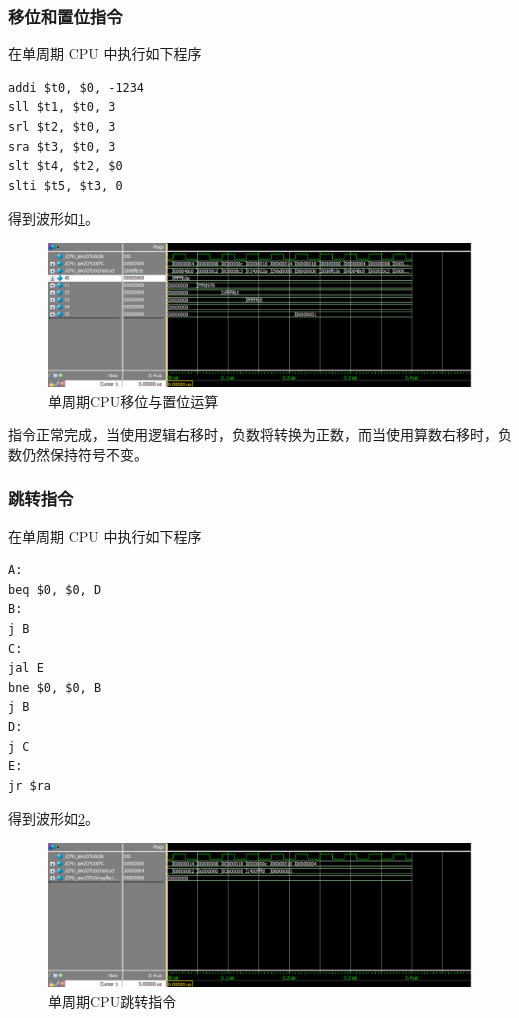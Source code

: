\documentclass{ctexart}
\begin{document}
	\subsubsection{移位和置位指令}

	在单周期 CPU 中执行如下程序

\begin{lstlisting}
addi $t0, $0, -1234
sll $t1, $t0, 3
srl $t2, $t0, 3
sra $t3, $t0, 3
slt $t4, $t2, $0
slti $t5, $t3, 0
\end{lstlisting}

	得到波形如\ref{simpicture4}。

	\begin{figure}[ht]
		\centering
		\includegraphics[width = \textwidth]{OneCycleTestWave3.eps}
		\caption{单周期CPU移位与置位运算}
		\label{simpicture4}
	\end{figure}	

	指令正常完成，当使用逻辑右移时，负数将转换为正数，而当使用算数右移时，负数仍然保持符号不变。	

	\subsubsection{跳转指令}

	在单周期 CPU 中执行如下程序

\begin{lstlisting}
A:
beq $0, $0, D
B:
j B
C:
jal E
bne $0, $0, B
j B
D:
j C
E:
jr $ra
\end{lstlisting}	

	得到波形如\ref{simpicture5}。

	\begin{figure}[ht]
		\centering
		\includegraphics[width = \textwidth]{OneCycleTestWave4.eps}
		\caption{单周期CPU跳转指令}
		\label{simpicture5}
	\end{figure}		
	
\end{document}
